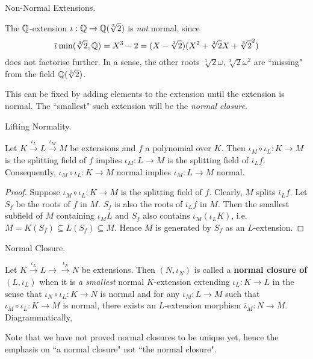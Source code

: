 \documentclass[../book.tex]{subfiles}
\begin{document}
\begin{eg} Non-Normal Extensions. 
    
    The $\mathbb{Q}$-extension $\iota : \mathbb{Q} \to \mathbb{Q}(\sqrt[3]{2})$ is \emph{not} normal, 
    since \[
        \overline{\iota}\min(\sqrt[3]{2},\mathbb{Q}) = X^3 - 2 
        = (X - \sqrt[3]{2})(X^2 + \sqrt[3]{2}X + \sqrt[3]{2}^2)
    \]
    does not factorise further. 
    In a sense, the other roots $\sqrt[3]{2}\omega, \sqrt[3]{2}\omega^2$ 
    are ``missing" from the field $\mathbb{Q}(\sqrt[3]{2})$. 
    
    This can be fixed by adding elements to the extension until 
    the extension is normal.
    The ``smallest" such extension will be the \emph{normal closure}.
\end{eg}
\begin{lem} Lifting Normality. 

    Let $K \overset{\iota_L}{\to} L \overset{\iota_M}{\to} M$ be extensions
    and $f$ a polynomial over $K$. 
    Then $\iota_M\circ\iota_L : K \to M$ is the splitting field of $f$
    implies $\iota_M : L \to M$ is the splitting field of $\bar\iota_L f$. 
    Consequently, $\iota_M\circ\iota_L : K \to M$ normal 
    implies $\iota_M : L \to M$ normal. 
    
\end{lem}
\begin{proof}
    Suppose $\iota_M\circ\iota_L : K \to M$ is the splitting field of $f$. 
    Clearly, $M$ splits $\bar\iota_L f$. 
    Let $S_f$ be the roots of $f$ in $M$. 
    $S_f$ is also the roots of $\bar\iota_L f$ in $M$. 
    Then the smallest subfield of $M$ containing $\iota_M L$ and $S_f$ 
    also contains $\iota_M(\iota_L K)$, 
    i.e. $M = K(S_f) \subseteq L(S_f) \subseteq M$.
    Hence $M$ is generated by $S_f$ as an $L$-extension. 
\end{proof}
\begin{dfn} Normal Closure. 
    
    Let $K \overset{\iota_L}{\to} L \to \overset{\iota_N}{\to} N$ be extensions. 
    Then $(N,\iota_N)$ is called 
    a \textbf{normal closure of $(L,\iota_L)$} when
    it is \emph{a smallest} normal $K$-extension extending $\iota_L : K \to L$
    in the sense that $\iota_N\circ\iota_L : K \to N$ is normal and 
    for any $\iota_M : L \to M$ such that $\iota_M\circ\iota_L : K \to M$ is normal,
    there exists an $L$-extension morphism $\bar\iota_M : N \to M$.
    Diagrammatically, 
    \begin{figure} [H]
        \centering
    \end{figure}
    
    Note that we have not proved normal closures to be unique yet,
    hence the emphasis on ``a normal closure" not ``the normal closure". 
\end{dfn}
\end{document}
